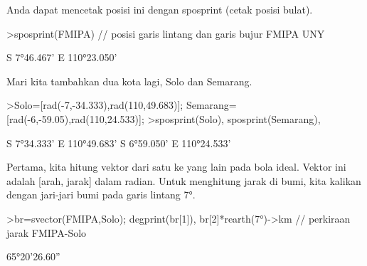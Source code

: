 \documentclass[a4paper,10pt]{article}
\begin{document}
\begin{eulernotebook}
\begin{eulercomment}
\begin{eulercomment}
\begin{eulercomment}
\begin{eulercomment}
\begin{eulercomment}
\begin{eulercomment}
\begin{eulercomment}
\begin{eulercomment}
\begin{eulercomment}
\begin{eulercomment}
\begin{eulercomment}
\begin{eulercomment}
\begin{eulercomment}
\begin{eulercomment}
\begin{eulercomment}
\begin{eulercomment}
\begin{eulercomment}
\begin{eulercomment}
\begin{eulercomment}
\begin{eulercomment}
\begin{eulercomment}
\begin{eulercomment}
\begin{eulercomment}
\begin{eulercomment}
\begin{eulercomment}
\begin{eulercomment}
\begin{eulercomment}
\begin{eulercomment}
\begin{eulercomment}
\begin{eulercomment}
\begin{eulercomment}
\begin{eulercomment}
\begin{eulercomment}
\begin{eulercomment}
\begin{eulercomment}
\begin{eulercomment}
\begin{eulercomment}
\begin{eulercomment}
\begin{eulercomment}
\begin{eulercomment}
\begin{eulercomment}
\begin{eulercomment}
\begin{eulercomment}
\begin{eulercomment}
\begin{eulercomment}
\begin{eulercomment}
\begin{eulercomment}
\begin{eulercomment}
\begin{eulercomment}
\begin{eulercomment}
\begin{eulercomment}
\begin{eulercomment}
\begin{eulercomment}
\begin{eulercomment}
\begin{eulercomment}
\begin{eulercomment}
\begin{eulercomment}
\begin{eulercomment}
\begin{eulercomment}
\begin{eulercomment}
\begin{eulercomment}
\begin{eulercomment}
\begin{eulercomment}
\begin{eulercomment}
\begin{euleroutput}
[-0.13569,  1.92657]
\end{euleroutput}
\begin{eulercomment}
Anda dapat mencetak posisi ini dengan sposprint (cetak posisi bulat).
\end{eulercomment}
\begin{eulerprompt}
>sposprint(FMIPA) // posisi garis lintang dan garis bujur FMIPA UNY
\end{eulerprompt}
\begin{euleroutput}
  S 7°46.467' E 110°23.050'
\end{euleroutput}
\begin{eulercomment}
Mari kita tambahkan dua kota lagi, Solo dan Semarang.
\end{eulercomment}
\begin{eulerprompt}
>Solo=[rad(-7,-34.333),rad(110,49.683)]; Semarang=[rad(-6,-59.05),rad(110,24.533)];
>sposprint(Solo), sposprint(Semarang),
\end{eulerprompt}
\begin{euleroutput}
  S 7°34.333' E 110°49.683'
  S 6°59.050' E 110°24.533'
\end{euleroutput}
\begin{eulercomment}
Pertama, kita hitung vektor dari satu ke yang lain pada bola ideal.
Vektor ini adalah [arah, jarak] dalam radian. Untuk menghitung jarak
di bumi, kita kalikan dengan jari-jari bumi pada garis lintang 7°.
\end{eulercomment}
\begin{eulerprompt}
>br=svector(FMIPA,Solo); degprint(br[1]), br[2]*rearth(7°)->km // perkiraan jarak FMIPA-Solo
\end{eulerprompt}
\begin{euleroutput}
  65°20'26.60''
  
\end{euleroutput}
\end{eulercomment}
\end{eulercomment}
\end{eulercomment}
\end{eulercomment}
\end{eulercomment}
\end{eulercomment}
\end{eulercomment}
\end{eulercomment}
\end{eulercomment}
\end{eulercomment}
\end{eulercomment}
\end{eulercomment}
\end{eulercomment}
\end{eulercomment}
\end{eulercomment}
\end{eulercomment}
\end{eulercomment}
\end{eulercomment}
\end{eulercomment}
\end{eulercomment}
\end{eulercomment}
\end{eulercomment}
\end{eulercomment}
\end{eulercomment}
\end{eulercomment}
\end{eulercomment}
\end{eulercomment}
\end{eulercomment}
\end{eulercomment}
\end{eulercomment}
\end{eulercomment}
\end{eulercomment}
\end{eulercomment}
\end{eulercomment}
\end{eulercomment}
\end{eulercomment}
\end{eulercomment}
\end{eulercomment}
\end{eulercomment}
\end{eulercomment}
\end{eulercomment}
\end{eulercomment}
\end{eulercomment}
\end{eulercomment}
\end{eulercomment}
\end{eulercomment}
\end{eulercomment}
\end{eulercomment}
\end{eulercomment}
\end{eulercomment}
\end{eulercomment}
\end{eulercomment}
\end{eulercomment}
\end{eulercomment}
\end{eulercomment}
\end{eulercomment}
\end{eulercomment}
\end{eulercomment}
\end{eulercomment}
\end{eulercomment}
\end{eulercomment}
\end{eulercomment}
\end{eulercomment}
\end{eulercomment}
\end{eulernotebook}
\end{document}
